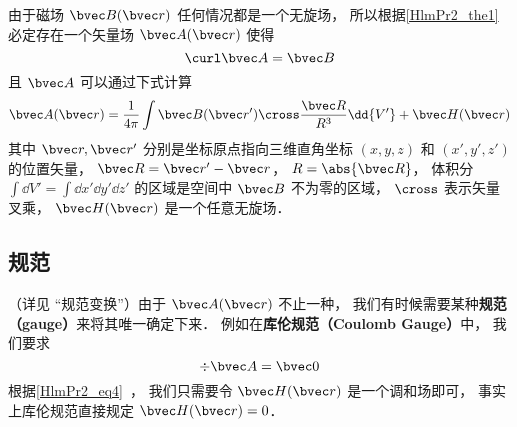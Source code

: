 
\begin{issues}
\issueDraft
\end{issues}


由于磁场 $\bvec B(\bvec r)$ 任何情况都是一个无旋场， 所以根据\autoref{HlmPr2_the1}~ 必定存在一个矢量场 $\bvec A(\bvec r)$ 使得
\begin{equation}
\curl \bvec A = \bvec B
\end{equation}
且 $\bvec A$ 可以通过下式计算
\begin{equation}
\bvec A(\bvec r) = \frac{1}{4\pi} \int \bvec B(\bvec r') \cross \frac{\bvec R}{R^3} \dd{V'} + \bvec H(\bvec r)
\end{equation}
其中 $\bvec r, \bvec r'$ 分别是坐标原点指向三维直角坐标 $(x, y, z)$ 和 $(x', y', z')$ 的位置矢量， $\bvec R = \bvec r' - \bvec r$， $R = \abs{\bvec R}$， 体积分 $\int\dd{V'} = \int\dd{x'}\dd{y'}\dd{z'}$ 的区域是空间中 $\bvec B$ 不为零的区域， $\cross$ 表示矢量叉乘， $\bvec H(\bvec r)$ 是一个任意无旋场．

\subsection{规范}
（详见 “规范变换”）由于 $\bvec A(\bvec r)$ 不止一种， 我们有时候需要某种\textbf{规范（gauge）}来将其唯一确定下来． 例如在\textbf{库伦规范（Coulomb Gauge）}中， 我们要求
\begin{equation}
\div \bvec A = \bvec 0
\end{equation}
根据\autoref{HlmPr2_eq4}~， 我们只需要令 $\bvec H(\bvec r)$ 是一个调和场即可， 事实上库伦规范直接规定 $\bvec H(\bvec r) = 0$．
